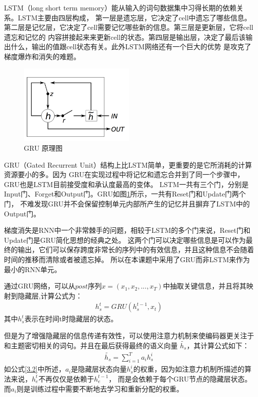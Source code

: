 \documentclass[supercite]{HustGraduPaper}
\theoremstyle{definition}
\begin{document}
LSTM\cite{gers1999learning}（long short term memory）能从输入的词句数据集中习得长期的依赖关系。LSTM主要由四层构成，
第一层是遗忘层，它决定了cell中遗忘了哪些信息。第二层是记忆层，它决定了cell需要记忆哪些新的信息。第三层是更新层，它将cell遗忘和记忆的
内容拼接起来来更新cell的状态。第四层是输出层，决定了最后该输出什么，输出的值跟cell状态有关。此外LSTM网络还有一个巨大的优势
是攻克了梯度爆炸和消失的难题。

\begin{figure}[H] %
  \centering %
  \includegraphics[width=0.5\textwidth]{images/GRU.png} %
  \caption{GRU 原理图} %
  \label{Fig.GRU} %
\end{figure}

GRU\cite{dey2017gate}（Gated Recurrent Unit）结构上比LSTM简单，更重要的是它所消耗的计算资源要小的多。因为
GRU在实现过程中将记忆和遗忘合并到了同一个步骤中，GRU也是LSTM目前接受度和承认度最高的变体。
LSTM一共有三个门，分别是Input门、Forget和Output门。GRU如图\ref{Fig.GRU}所示，一共有Reset门和Update门两个门，
不难发现GRU并不会保留控制单元内部所产生的记忆并且摒弃了LSTM中的Output门。

梯度消失是RNN中一个非常棘手的问题，相较于LSTM的多个门来说，Reset门和Update门是GRU简化思想的经典之处。
这两个门可以决定哪些信息是可以作为最终的输出，它们可以保存跨度非常长的序列中的有效信息，并且这种信息不会随着时间的推移而清除或者被遗忘掉。
所以在本课题中采用了GRU而非LSTM来作为最小的RNN单元。

通过GRU网络，可以从$post$序列$x = (x_1,x_2,...,x_T)$中抽取关键信息，并且将其映射到隐藏层,计算公式为：
\begin{align}
  h_s^t = GRU(h_s^{t-1},x_t) \label{3.1}
\end{align}
其中$h_s^t$表示在时间t时隐藏层的状态。

但是为了增强隐藏层的信息传递有效性，可以使用注意力机制来使编码器更关注于和主题密切相关的词句。并且在最后获得最终的语义向量
$\widetilde{h_s}$，其计算公式如下：
\begin{align}
  \widetilde{h_s} = \sum_{i=1}^{T}a_i h_s^i \label{3.2}
\end{align}
如公式\ref{3.2}中所述，$a_i$是隐藏层状态向量$h_s^i$的权重，因为如注意力机制所描述的算法来说，$h_e^t$不再仅仅是依赖于$h_e^{t-1}$，
而是会依赖于每个GRU节点的隐藏层状态。而$a_i$则是训练过程中需要不断地去学习和重新分配的权重。
\end{document}
